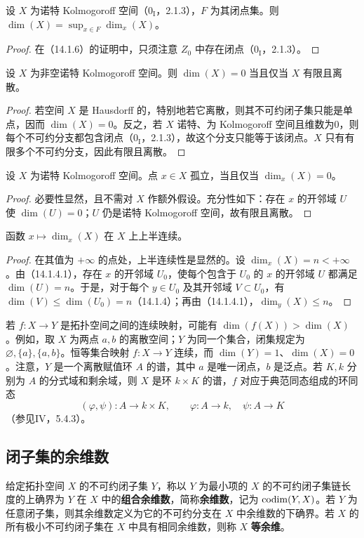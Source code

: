设 $X$ 为诺特 Kolmogoroff 空间（$0_{\mathrm I}$，2.1.3），$F$ 为其闭点集。则
$\dim(X)=\sup_{x\in F}\dim_x(X)$。
\begin{proof}
在（14.1.6）的证明中，只须注意 $Z_0$ 中存在闭点（$0_{\mathrm I}$，2.1.3）。
\end{proof}

设 $X$ 为非空诺特 Kolmogoroff 空间。则 $\dim(X)=0$ 当且仅当 $X$ 有限且离散。
\begin{proof}
若空间 $X$ 是 Hausdorff 的，特别地若它离散，则其不可约闭子集只能是单点，因而 $\dim(X)=0$。反之，若 $X$ 诺特、为 Kolmogoroff 空间且维数为0，则每个不可约分支都包含闭点（$0_{\mathrm I}$，2.1.3），故这个分支只能等于该闭点。$X$ 只有有限多个不可约分支，因此有限且离散。
\end{proof}

设 $X$ 为诺特 Kolmogoroff 空间。点 $x\in X$ 孤立，当且仅当 $\dim_x(X)=0$。
\begin{proof}
必要性显然，且不需对 $X$ 作额外假设。充分性如下：存在 $x$ 的开邻域 $U$ 使 $\dim(U)=0$；$U$ 仍是诺特 Kolmogoroff 空间，故有限且离散。
\end{proof}

函数 $x\mapsto\dim_x(X)$ 在 $X$ 上上半连续。
\begin{proof}
在其值为 $+\infty$ 的点处，上半连续性是显然的。设 $\dim_x(X)=n<+\infty$。由（14.1.4.1），存在 $x$ 的开邻域 $U_0$，使每个包含于 $U_0$ 的 $x$ 的开邻域 $U$ 都满足 $\dim(U)=n$。于是，对于每个 $y\in U_0$ 及其开邻域 $V\subset U_0$，有
$\dim(V)\leq\dim(U_0)=n$（14.1.4）；再由（14.1.4.1），$\dim_y(X)\leq n$。
\end{proof}

若 $f:X\to Y$ 是拓扑空间之间的连续映射，可能有 $\dim(f(X))>\dim(X)$。例如，取 $X$ 为两点 $a,b$ 的离散空间；$Y$ 为同一个集合，闭集规定为 $\varnothing,\{a\},\{a,b\}$。恒等集合映射 $f:X\to Y$ 连续，而 $\dim(Y)=1$、$\dim(X)=0$。注意，$Y$ 是一个离散赋值环 $A$ 的谱，其中 $a$ 是唯一闭点，$b$ 是泛点。若 $K,k$ 分别为 $A$ 的分式域和剩余域，则 $X$ 是环 $k\times K$ 的谱，$f$ 对应于典范同态组成的环同态
\[
 (\varphi,\psi):A\longrightarrow k\times K,\qquad
 \varphi:A\to k,\quad\psi:A\to K
\]
（参见IV，5.4.3）。

\subsection{闭子集的余维数}
给定拓扑空间 $X$ 的不可约闭子集 $Y$，称以 $Y$ 为最小项的 $X$ 的不可约闭子集链长度的上确界为 $Y$ 在 $X$ 中的\textbf{组合余维数}，简称\textbf{余维数}，记为 $\operatorname{codim}(Y,X)$。若 $Y$ 为任意闭子集，则其余维数定义为它的不可约分支在 $X$ 中余维数的下确界。若 $X$ 的所有极小不可约闭子集在 $X$ 中具有相同余维数，则称 $X$ \textbf{等余维}。

